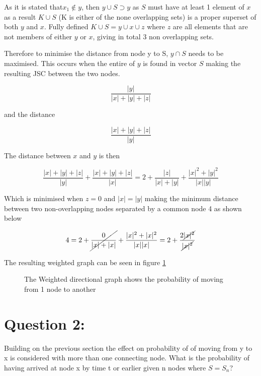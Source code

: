 As it is stated that$x_1 \notin y$, then $ y\cup S \supset y $ as $S$ must have at least 1 element of $x$ as a result $K \cup S$ (K is either of the none overlapping sets) is a proper superset of both $y$ and $x$. Fully defined $K \cup S = y \cup x \cup z$ where $z$ are all elements that are not members of either $y$ or $x$, giving in total 3 non overlapping sets.

Therefore to minimise the distance from node y to S, $y \cap S$ needs to be maximised. This occurs when the entire of $y$ is found in vector $S$ making the resulting JSC between the two nodes. 

\begin{equation}
    \frac{|y|}{|x|+|y|+|z|}
\end{equation}

and the distance

\begin{equation}
    \frac{|x|+|y|+|z|}{|y|}
\end{equation}

The distance between $x$ and $y$ is then

\begin{equation}
    \frac{|x|+|y|+|z|}{|y|} +\frac{|x|+|y|+|z|}{|x|} = 2 + \frac{|z|}{|x|+|y|}+\frac{|x|^2+|y|^2}{|x||y|}
\end{equation}

Which is minimised when $z=0$ and $|x|=|y|$ making the minimum distance between two non-overlapping nodes separated by a common node 4 as shown below


\begin{equation}
    4 =2 + \cancel{\frac{0}{|x|+|x|}}+\frac{|x|^2+|x|^2}{|x||x|} =2+\frac{2\cancel{|x|^2}}{\cancel{|x|^2}}
\end{equation}


The resulting weighted graph can be seen in figure \ref{net:weight3nodes}

\begin{figure}
    \centering
    
    \caption[Three Node directed graph]{The Weighted directional graph shows the probability of moving from 1 node to another}
    \label{net:weight3nodes}
\end{figure}

\section{Question 2:}
Building on the previous section the effect on probability of of moving from y to x is considered with more than one connecting node. What is the probability of having arrived at node x by time t or earlier given n nodes where $S=S_n$?

